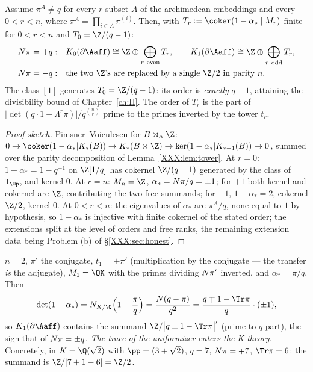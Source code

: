 \begin{theorem}\label{XXX:thm:main}
Assume $\pi^A\ne q$ for every $r$-subset $A$ of the archimedean embeddings and every
$0<r<n$, where $\pi^A=\prod_{i\in A}\pi^{(i)}$. Then, with $T_r:=\coker(1-\alpha_*\mid
M_r)$ finite for $0<r<n$ and $T_0=\Z/(q-1)$:
\begin{align*}
\Ns\pi=+q:&\quad K_0(\partial\Aaff)\cong\Z\oplus\bigoplus_{r\ \mathrm{even}}T_r,\qquad
K_1(\partial\Aaff)\cong\Z\oplus\bigoplus_{r\ \mathrm{odd}}T_r,\\
\Ns\pi=-q:&\quad\text{the two }\Z\text{'s are replaced by a single }\Z/2\text{ in parity }n .
\end{align*}
The class $[1]$ generates $T_0=\Z/(q-1)$: its order is \emph{exactly} $q-1$, attaining the
divisibility bound of Chapter~\ref{ch:II}. The order of $T_r$ is the part of
$\bigl|\det(q\cdot1-\Lambda^r\pi)\bigr|/q^{\binom nr}$ prime to the primes inverted by the
tower $t_r$.
\end{theorem}

\begin{proof}[Proof sketch]
Pimsner--Voiculescu \cite{PV} for $B\rtimes_\alpha\Z$:
$0\to\coker(1-\alpha_*|K_*(B))\to K_*(B\rtimes\Z)\to\ker(1-\alpha_*|K_{*+1}(B))\to0$,
summed over the parity decomposition of Lemma~\ref{XXX:lem:tower}. At $r=0$:
$1-\alpha_*=1-q^{-1}$ on $\Z[1/q]$ has cokernel $\Z/(q-1)$ generated by the class of
$1_{\Op}$, and kernel $0$. At $r=n$: $M_n=\Z$, $\alpha_*=N\pi/q=\pm1$; for $+1$ both
kernel and cokernel are $\Z$, contributing the two free summands; for $-1$,
$1-\alpha_*=2$, cokernel $\Z/2$, kernel $0$. At $0<r<n$: the eigenvalues of $\alpha_*$
are $\pi^A/q$, none equal to $1$ by hypothesis, so $1-\alpha_*$ is injective with finite
cokernel of the stated order; the extensions split at the level of orders and free ranks,
the remaining extension data being Problem (b) of \S\ref{XXX:sec:honest}.
\end{proof}

\begin{example}\label{XXX:ex:quadratic}
$n=2$, $\pi'$ the conjugate, $t_1=\pm\pi'$ (multiplication by the conjugate --- the
transfer \emph{is} the adjugate), $M_1=\OK$ with the primes dividing $N\pi'$ inverted,
and $\alpha_*=\pi/q$. Then
\[
\det(1-\alpha_*)=\Ns_{K/\Q}\Bigl(1-\frac{\pi}{q}\Bigr)=\frac{\Ns(q-\pi)}{q^2}
=\frac{q\mp1-\Tr\pi}{q}\cdot(\pm1),
\]
so $K_1(\partial\Aaff)$ contains the summand $\Z/\bigl|q\pm1-\Tr\pi\bigr|'$ (prime-to-$q$
part), the sign that of $N\pi=\pm q$. \emph{The trace of the uniformizer enters the
K-theory.} Concretely, in $K=\Q(\sqrt2)$ with $\pp=(3+\sqrt2)$, $q=7$, $N\pi=+7$,
$\Tr\pi=6$: the summand is $\Z/|7+1-6|=\Z/2$.
\end{example}

